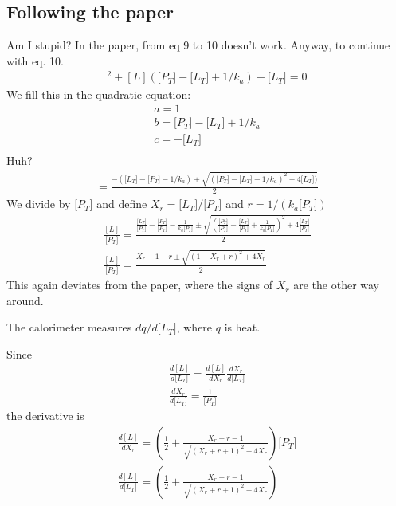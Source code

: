 \documentclass[11pt, fleqn]{report}
\newcommand{\lc}{[L]}
\newcommand{\ka}{k_a}
\newcommand{\pcz}{\lbrack P_T\rbrack}
\newcommand{\lcz}{\lbrack L_T\rbrack}
\newcommand{\xr}{X_r}
\begin{document}
\subsection*{Following the paper}
Am I stupid? In the paper, from eq 9 to 10 doesn't work. Anyway, to continue with eq. 10.
\begin{eqnarray}
\lc^2 + \lc ( \pcz - \lcz + 1/\ka) - \lcz = 0 
\end{eqnarray}
We fill this in the quadratic equation:
\begin{eqnarray}
a=1\\
b=\pcz - \lcz + 1/\ka\\
c=-\lcz\\
\end{eqnarray}
Huh?
\begin{eqnarray}
\lc=\frac{-(\lcz-\pcz-1/\ka)\pm\sqrt{(\pcz-\lcz-1/\ka)^2+4\lcz)}}{2}
\end{eqnarray}
We divide by $\pcz$ and define $\xr=\lcz/\pcz$ and $r=1/(\ka\pcz)$
\begin{eqnarray}
\frac{\lc}{\pcz} = \frac{\frac{\lcz}{\pcz}-\frac{\pcz}{\pcz}-\frac{1}{\ka\pcz} \pm \sqrt{(\frac{\pcz}{\pcz}-\frac{\lcz}{\pcz}+\frac{1}{\ka\pcz})^2+4\frac{\lcz}{\pcz}}}{2}\\
\frac{\lc}{\pcz} = \frac{\xr - 1 - r \pm \sqrt{(1 - \xr + r)^2 + 4\xr}}{2}
\end{eqnarray}
This again deviates from the paper, where the signs of $X_r$ are the other way around.

The calorimeter measures $d q / d \lcz$, where $q$ is heat.

Since
\begin{eqnarray}
\frac{d\lc}{d\lcz}=\frac{d\lc}{d\xr}\frac{d\xr}{d\lcz}\\
\frac{d\xr}{d\lcz}=\frac{1}{\pcz}
\end{eqnarray}
the derivative is
\begin{eqnarray}
\frac{d\lc}{d\xr} = \left( \frac{1}{2} + \frac{\xr+r-1}{\sqrt{(\xr+r+1)^2-4\xr}} \right) \pcz \\
\frac{d\lc}{d\lcz} = \left( \frac{1}{2} + \frac{\xr+r-1}{\sqrt{(\xr+r+1)^2-4\xr}} \right) 
\end{eqnarray}
\end{document}
